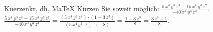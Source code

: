 \begin{MAufgabe}{Kuerzen}{kr, dh, MaTeX}
K\"urzen Sie soweit m\"oglich: $\frac{5\, x^4\, y^3\, z^4 - 15\, x^4\, y^3\, z^7}{- 40\, x^4\, y^3\, z^4}$.\\ 
\ifLsg\MLoesung
\quad $\frac{5\, x^4\, y^3\, z^4 - 15\, x^4\, y^3\, z^7}{- 40\, x^4\, y^3\, z^4}=\frac{(5\, x^4\, y^3\, z^4)\cdot(1 - 3\, z^3)}{(5\, x^4\, y^3\, z^4)\cdot(-8)}=\frac{1 - 3\, z^3}{-8}=\frac{3\, z^3 - 1}{8}$.\else\relax\fi
 \end{MAufgabe}
